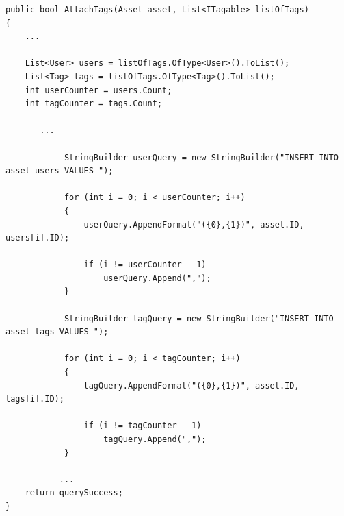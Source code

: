 \begin{listing}[H]
\begin{verbatim}
public bool AttachTags(Asset asset, List<ITagable> listOfTags)
{
    ...
        
    List<User> users = listOfTags.OfType<User>().ToList();
    List<Tag> tags = listOfTags.OfType<Tag>().ToList();
    int userCounter = users.Count;
    int tagCounter = tags.Count;
        
       ...

            StringBuilder userQuery = new StringBuilder("INSERT INTO asset_users VALUES ");

            for (int i = 0; i < userCounter; i++)
            {
                userQuery.AppendFormat("({0},{1})", asset.ID, users[i].ID);

                if (i != userCounter - 1)
                    userQuery.Append(",");
            }

            StringBuilder tagQuery = new StringBuilder("INSERT INTO asset_tags VALUES ");

            for (int i = 0; i < tagCounter; i++)
            {
                tagQuery.AppendFormat("({0},{1})", asset.ID, tags[i].ID);
                
                if (i != tagCounter - 1)
                    tagQuery.Append(",");
            }
            
           ...
    return querySuccess;
}
\end{verbatim}
\label{code:AssetRepositoryAttachTags}
\end{listing}
